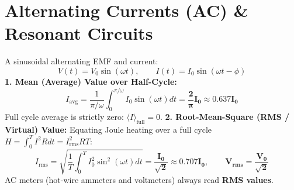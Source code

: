 \documentclass[10pt,a4paper]{article}
\begin{document}
\section{Alternating Currents (AC) \& Resonant Circuits}

\begin{conceptbox}
A sinusoidal alternating EMF and current:
\begin{equation}
  V(t) = V_0 \sin(\omega t), \qquad I(t) = I_0 \sin(\omega t - \phi)
\end{equation}
\textbf{1. Mean (Average) Value over Half-Cycle:}
\begin{equation}
  I_{\text{avg}} = \frac{1}{\pi/\omega} \int_0^{\pi/\omega} I_0 \sin(\omega t) dt = \mathbf{\frac{2}{\pi} I_0 \approx 0.637 I_0}
\end{equation}
Full cycle average is strictly zero: $\langle I \rangle_{\text{full}} = 0$.
\textbf{2. Root-Mean-Square (RMS / Virtual) Value:}
Equating Joule heating over a full cycle $H = \int_0^T I^2 R dt = I_{\text{rms}}^2 R T$:
\begin{equation}
  I_{\text{rms}} = \sqrt{\frac{1}{T} \int_0^T I_0^2 \sin^2(\omega t) dt} = \mathbf{\frac{I_0}{\sqrt{2}} \approx 0.707 I_0}, \qquad \mathbf{V_{\text{rms}} = \frac{V_0}{\sqrt{2}}}
\end{equation}
AC meters (hot-wire ammeters and voltmeters) always read \textbf{RMS values}.
\end{conceptbox}
\end{document}
